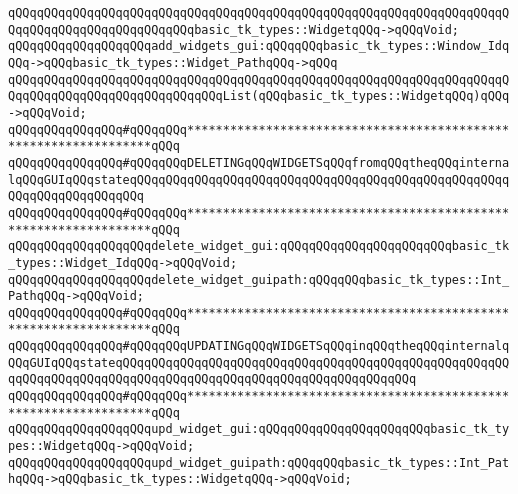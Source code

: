 \verb|qQQqqQQqqQQqqQQqqQQqqQQqqQQqqQQqqQQqqQQqqQQqqQQqqQQqqQQqqQQqqQQqqQQqqQQqqQQqqQQqqQQqqQQqqQQqqQQqbasic_tk_types::WidgetqQQq->qQQqVoid;|\newline
\verb|qQQqqQQqqQQqqQQqqQQqadd_widgets_gui:qQQqqQQqbasic_tk_types::Window_IdqQQq->qQQqbasic_tk_types::Widget_PathqQQq->qQQq|\newline
\verb|qQQqqQQqqQQqqQQqqQQqqQQqqQQqqQQqqQQqqQQqqQQqqQQqqQQqqQQqqQQqqQQqqQQqqQQqqQQqqQQqqQQqqQQqqQQqqQQqqQQqList(qQQqbasic_tk_types::WidgetqQQq)qQQq->qQQqVoid;|\newline
\newline
\newline
\verb|qQQqqQQqqQQqqQQq#qQQqqQQq*****************************************************************qQQq|\newline
\verb|qQQqqQQqqQQqqQQq#qQQqqQQqDELETINGqQQqWIDGETSqQQqfromqQQqtheqQQqinternalqQQqGUIqQQqstateqQQqqQQqqQQqqQQqqQQqqQQqqQQqqQQqqQQqqQQqqQQqqQQqqQQqqQQqqQQqqQQqqQQqqQQq|\newline
\verb|qQQqqQQqqQQqqQQq#qQQqqQQq*****************************************************************qQQq|\newline
\newline
\verb|qQQqqQQqqQQqqQQqqQQqdelete_widget_gui:qQQqqQQqqQQqqQQqqQQqqQQqbasic_tk_types::Widget_IdqQQq->qQQqVoid;|\newline
\verb|qQQqqQQqqQQqqQQqqQQqdelete_widget_guipath:qQQqqQQqbasic_tk_types::Int_PathqQQq->qQQqVoid;|\newline
\newline
\newline
\verb|qQQqqQQqqQQqqQQq#qQQqqQQq*****************************************************************qQQq|\newline
\verb|qQQqqQQqqQQqqQQq#qQQqqQQqUPDATINGqQQqWIDGETSqQQqinqQQqtheqQQqinternalqQQqGUIqQQqstateqQQqqQQqqQQqqQQqqQQqqQQqqQQqqQQqqQQqqQQqqQQqqQQqqQQqqQQqqQQqqQQqqQQqqQQqqQQqqQQqqQQqqQQqqQQqqQQqqQQqqQQqqQQqqQQq|\newline
\verb|qQQqqQQqqQQqqQQq#qQQqqQQq*****************************************************************qQQq|\newline
\newline
\verb|qQQqqQQqqQQqqQQqqQQqupd_widget_gui:qQQqqQQqqQQqqQQqqQQqqQQqbasic_tk_types::WidgetqQQq->qQQqVoid;|\newline
\verb|qQQqqQQqqQQqqQQqqQQqupd_widget_guipath:qQQqqQQqbasic_tk_types::Int_PathqQQq->qQQqbasic_tk_types::WidgetqQQq->qQQqVoid;|\newline
\newline
